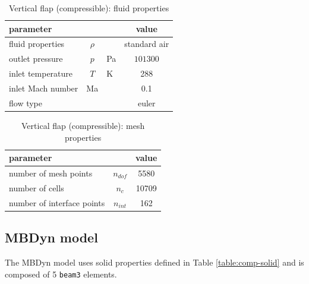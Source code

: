 \begin{table}[!h]
	\begin{center}
		\begin{tabular}{ l c l | c } 
			parameter & & & value  \\ 
			\hline
			fluid properties  & $\rho$ &  & standard air   \\
			outlet pressure & $p$& \si{Pa} & $101300$  \\
			inlet temperature & $T$ & \si{K} & 288  \\
			inlet Mach number &  Ma &  & 0.1 \\
			flow type & & & euler \\
		\end{tabular}
	\end{center}
	\caption{Vertical flap (compressible): fluid properties}
	\label{table:comp-fluid}
\end{table}



\begin{table}[!h]
	\begin{center}
		\begin{tabular}{ l c | c } 
			parameter & & value   \\ 
			\hline
			number of mesh points  & $n_{dof}$ & 5580     \\
			number of cells & $n_c$ & 10709  \\
			number of interface points  & $n_{int}$ & 162  \\			
		\end{tabular}
	\end{center}
	\caption{Vertical flap (compressible): mesh properties}
	\label{table:comp-mesh}
\end{table}


\subsection{MBDyn model}


The MBDyn model uses solid properties defined in Table \ref{table:comp-solid} and is composed of 5 \texttt{beam3} elements. 

